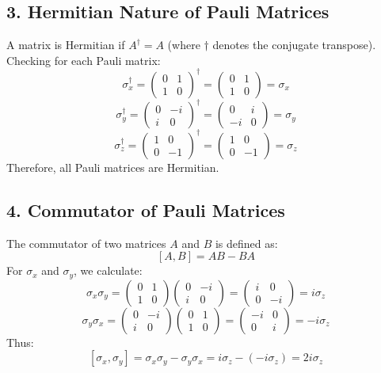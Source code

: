 \documentclass[a4paper,12pt]{article}
\begin{document}
\begin{multicols}{2}
\subsection*{3. Hermitian Nature of Pauli Matrices}
A matrix is Hermitian if $A^\dagger = A$ (where $\dagger$ denotes the conjugate transpose). Checking for each Pauli matrix:
\[
\sigma_x^\dagger = \begin{pmatrix} 0 & 1 \\ 1 & 0 \end{pmatrix}^\dagger = \begin{pmatrix} 0 & 1 \\ 1 & 0 \end{pmatrix} = \sigma_x
\]
\[
\sigma_y^\dagger = \begin{pmatrix} 0 & -i \\ i & 0 \end{pmatrix}^\dagger = \begin{pmatrix} 0 & i \\ -i & 0 \end{pmatrix} = \sigma_y
\]
\[
\sigma_z^\dagger = \begin{pmatrix} 1 & 0 \\ 0 & -1 \end{pmatrix}^\dagger = \begin{pmatrix} 1 & 0 \\ 0 & -1 \end{pmatrix} = \sigma_z
\]
Therefore, all Pauli matrices are Hermitian.

\subsection*{4. Commutator of Pauli Matrices}
The commutator of two matrices $A$ and $B$ is defined as:
\[
[A, B] = AB - BA
\]
For $\sigma_x$ and $\sigma_y$, we calculate:
\[
\sigma_x \sigma_y = \begin{pmatrix} 0 & 1 \\ 1 & 0 \end{pmatrix} \begin{pmatrix} 0 & -i \\ i & 0 \end{pmatrix} = \begin{pmatrix} i & 0 \\ 0 & -i \end{pmatrix} = i \sigma_z
\]
\[
\sigma_y \sigma_x = \begin{pmatrix} 0 & -i \\ i & 0 \end{pmatrix} \begin{pmatrix} 0 & 1 \\ 1 & 0 \end{pmatrix} = \begin{pmatrix} -i & 0 \\ 0 & i \end{pmatrix} = -i \sigma_z
\]
Thus:
\[
[\sigma_x, \sigma_y] = \sigma_x \sigma_y - \sigma_y \sigma_x = i\sigma_z - (-i\sigma_z) = 2i\sigma_z
\]


\end{multicols}
\end{document}
